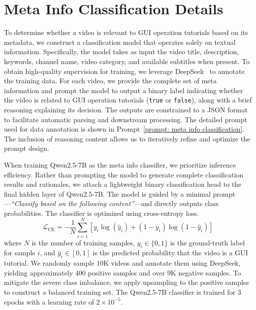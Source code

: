 \documentclass{llmxive}
\begin{document}
\section{Meta Info Classification Details}
\label{sec: metadata classification}

To determine whether a video is relevant to GUI operation tutorials based on its metadata, we construct a classification model that operates solely on textual information. Specifically, the model takes as input the video title, description, keywords, channel name, video category, and available subtitles when present. To obtain high-quality supervision for training, we leverage DeepSeek~\cite{liu2024deepseek} to annotate the training data. For each video, we provide the complete set of meta information and prompt the model to output a binary label indicating whether the video is related to GUI operation tutorials (\texttt{true} or \texttt{false}), along with a brief reasoning explaining its decision. The outputs are constrained to a JSON format to facilitate automatic parsing and downstream processing. The detailed prompt used for data annotation is shown in Prompt~\ref{prompt: meta info classification}. The inclusion of reasoning content allows us to iteratively refine and optimize the prompt design.

When training Qwen2.5-7B as the meta info classifier, we prioritize inference efficiency. Rather than prompting the model to generate complete classification results and rationales, we attach a lightweight binary classification head to the final hidden layer of Qwen2.5-7B. The model is guided by a minimal prompt—\emph{``Classify based on the following content''}—and directly outputs class probabilities. The classifier is optimized using cross-entropy loss.
\begin{equation}
\mathcal{L}_{\text{CE}} = -\frac{1}{N}\sum_{i=1}^{N}\left[y_i\log(\hat{y}_i) + (1-y_i)\log(1-\hat{y}_i)\right]
\end{equation}
where $N$ is the number of training samples, $y_i \in \{0, 1\}$ is the ground-truth label for sample $i$, and $\hat{y}_i \in [0, 1]$ is the predicted probability that the video is a GUI tutorial.
We randomly sample 10K videos and annotate them using DeepSeek, yielding approximately 400 positive samples and over 9K negative samples. To mitigate the severe class imbalance, we apply upsampling to the positive samples to construct a balanced training set. The Qwen2.5-7B classifier is trained for 3 epochs with a learning rate of $2 \times 10^{-5}$.
\end{document}
